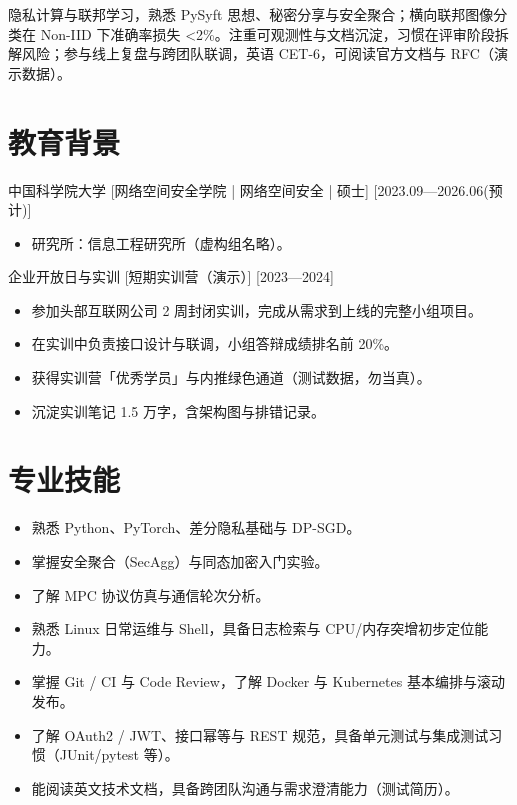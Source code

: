 \documentclass{resume-photo}
\begin{document}

\ResumeTitle

\noindent 隐私计算与联邦学习，熟悉 PySyft 思想、秘密分享与安全聚合；横向联邦图像分类在 Non-IID 下准确率损失 <2\%。注重可观测性与文档沉淀，习惯在评审阶段拆解风险；参与线上复盘与跨团队联调，英语 CET-6，可阅读官方文档与 RFC（演示数据）。

\section{教育背景}
\ResumeItem
{中国科学院大学}
[\textnormal{网络空间安全学院 | 网络空间安全 | 硕士}]
[2023.09—2026.06(预计)]

\begin{itemize}
  \item 研究所：信息工程研究所（虚构组名略）。
\end{itemize}


\ResumeItem
{企业开放日与实训}
[\textnormal{短期实训营（演示）}]
[2023—2024]

\begin{itemize}
  \item 参加头部互联网公司 2 周封闭实训，完成从需求到上线的完整小组项目。
  \item 在实训中负责接口设计与联调，小组答辩成绩排名前 20\%。
  \item 获得实训营「优秀学员」与内推绿色通道（测试数据，勿当真）。
  \item 沉淀实训笔记 1.5 万字，含架构图与排错记录。
\end{itemize}



\section{专业技能}
\begin{itemize}
  \item 熟悉 Python、PyTorch、差分隐私基础与 DP-SGD。
  \item 掌握安全聚合（SecAgg）与同态加密入门实验。
  \item 了解 MPC 协议仿真与通信轮次分析。
  \item 熟悉 Linux 日常运维与 Shell，具备日志检索与 CPU/内存突增初步定位能力。
  \item 掌握 Git / CI 与 Code Review，了解 Docker 与 Kubernetes 基本编排与滚动发布。
  \item 了解 OAuth2 / JWT、接口幂等与 REST 规范，具备单元测试与集成测试习惯（JUnit/pytest 等）。
  \item 能阅读英文技术文档，具备跨团队沟通与需求澄清能力（测试简历）。
\end{itemize}
\end{document}
